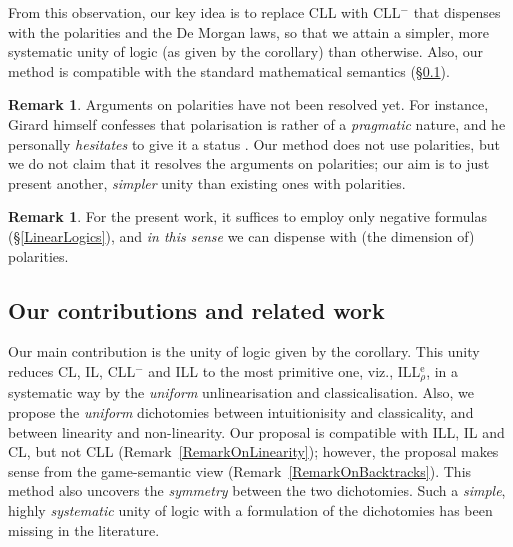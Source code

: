 \documentclass[a4paper]{article}
\theoremstyle{definition}
\newtheorem{remark}[definition]{Remark}
\theoremstyle{theorem}
\theoremstyle{remark}
\begin{document}
From this observation, our key idea is to replace CLL with CLL$^-$ that dispenses with the polarities and the De Morgan laws, so that we attain a simpler, more systematic unity of logic (as given by the corollary) than otherwise.
Also, our method is compatible with the standard mathematical semantics (\S\ref{OurContributionsAndRelatedWork}). %

\begin{remark}
Arguments on polarities have not been resolved yet.
For instance, Girard himself confesses that polarisation is rather of a \emph{pragmatic} nature, and he personally \emph{hesitates} to give it a status \cite[p.~251]{girard2011blind}.
Our method does not use polarities, but we do not claim that it resolves the arguments on polarities; our aim is to just present another, \emph{simpler} unity than existing ones with polarities.
\end{remark}

\begin{remark}
For the present work, it suffices to employ only negative formulas (\S\ref{LinearLogics}), and \emph{in this sense} we can dispense with (the dimension of) polarities.
\end{remark}
\fi


















\subsection{Our contributions and related work}
\label{OurContributionsAndRelatedWork}
Our main contribution is the unity of logic given by the corollary.
This unity reduces CL, IL, CLL$^-$ and ILL to the most primitive one, viz., ILL$^{\text{e}}_\rho$, in a systematic way by the \emph{uniform} unlinearisation and classicalisation.
Also, we propose the \emph{uniform} dichotomies between intuitionisity and classicality, and between linearity and non-linearity.
Our proposal is compatible with ILL, IL and CL, but not CLL (Remark~\ref{RemarkOnLinearity}); however, the proposal makes sense from the game-semantic view (Remark~\ref{RemarkOnBacktracks}).
This method also uncovers the \emph{symmetry} between the two dichotomies.
Such a \emph{simple}, highly \emph{systematic} unity of logic with a formulation of the dichotomies has been missing in the literature.
\end{document}
